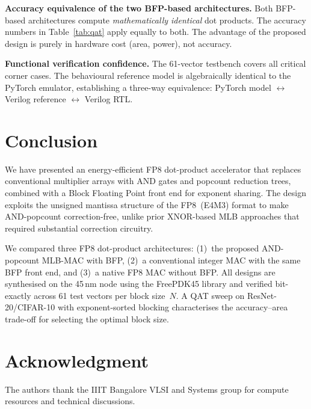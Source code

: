 \documentclass[conference]{IEEEtran}
\begin{document}
\textbf{Accuracy equivalence of the two BFP-based architectures.}
Both BFP-based architectures compute \emph{mathematically identical}
dot products.  The accuracy numbers in Table~\ref{tab:qat} apply
equally to both.  The advantage of the proposed design is purely
in hardware cost (area, power), not accuracy.

\textbf{Functional verification confidence.}
The 61-vector testbench covers all critical corner cases.  The
behavioural reference model is algebraically identical to the
PyTorch emulator, establishing a three-way equivalence: PyTorch
model $\leftrightarrow$ Verilog reference $\leftrightarrow$
Verilog RTL.

\section{Conclusion}

We have presented an energy-efficient FP8 dot-product accelerator
that replaces conventional multiplier arrays with AND gates and
popcount reduction trees, combined with a Block Floating Point
front end for exponent sharing.  The design exploits the unsigned
mantissa structure of the FP8~(E4M3) format to make AND-popcount
correction-free, unlike prior XNOR-based MLB approaches that
required substantial correction circuitry.

We compared three FP8 dot-product architectures: (1)~the proposed
AND-popcount MLB-MAC with BFP, (2)~a conventional integer MAC
with the same BFP front end, and (3)~a native FP8 MAC without BFP.
All designs are synthesised on the 45\,nm node using the FreePDK45
library and verified bit-exactly across 61 test vectors per block
size~$N$.
A QAT sweep on ResNet-20/CIFAR-10 with exponent-sorted blocking
characterises the accuracy--area trade-off for selecting the
optimal block size.

\section*{Acknowledgment}

The authors thank the IIIT Bangalore VLSI and Systems group for
compute resources and technical discussions.
\end{document}
